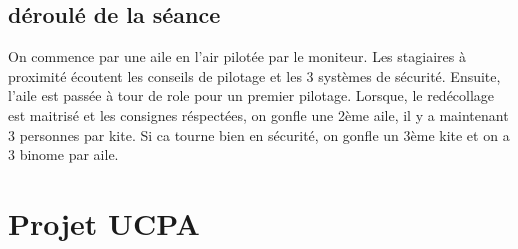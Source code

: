 \documentclass[12pt,a4paper]{report}
\begin{document}
\section{déroulé de la séance}
On commence par une aile en l'air pilotée par le moniteur.
Les stagiaires à proximité écoutent les conseils de pilotage et les 3 systèmes
de sécurité.
Ensuite, l'aile est passée à tour de role pour un premier pilotage.
Lorsque, le redécollage est maitrisé et les consignes réspectées, 
on gonfle une 2ème aile, il y a maintenant 3 personnes par kite.
Si ca tourne bien en sécurité, on gonfle un 3ème kite et on a 3 binome par aile.

\chapter{Projet UCPA\label{ucpa_projet}}



\end{document}

